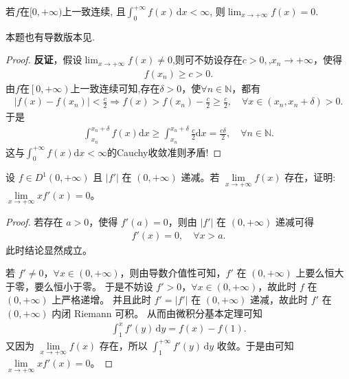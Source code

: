 \documentclass[../../main.tex]{subfiles}%
\begin{document}
\begin{proposition}\label{proposition:一致连续无穷积分收敛则极限为0}
若$f$在$[0, +\infty)$上一致连续, 且$\int_0^{+\infty} f(x) \, \mathrm{d}x < \infty$, 则$\lim_{x \to +\infty} f(x) = 0$.
\end{proposition}
\begin{note}
本题也有导数版本{见}.
\end{note}
\begin{proof}
\textbf{反证}，假设$\lim_{x\rightarrow +\infty} f\left( x \right) \ne 0$,则可不妨设存在$c>0,$,$x_n\rightarrow +\infty$，使得
\begin{align*}
f\left( x_n \right) \geqslant c>0.
\end{align*}
由$f$在$\left[ 0,+\infty \right)$上一致连续可知,存在$\delta >0$，使$\forall n\in \mathbb{N}$，都有
\begin{align*}
\left| f\left( x \right) -f\left( x_n \right) \right|<\frac{c}{2}\Longrightarrow f\left( x \right) >f\left( x_n \right) -\frac{c}{2}\geqslant \frac{c}{2},\quad \forall x\in \left( x_n,x_n+\delta \right) >0.
\end{align*}
于是
\begin{align*}
\int_{x_n}^{x_n+\delta}{f\left( x \right) \mathrm{d}x}\geqslant \int_{x_n}^{x_n+\delta}{\frac{c}{2}\mathrm{d}x}=\frac{c\delta}{2},\quad \forall n\in \mathbb{N} .
\end{align*}
这与$\int_0^{+\infty}{f\left( x \right) \mathrm{d}x}<\infty$的Cauchy收敛准则矛盾!
\end{proof}

\begin{example}
设 \(f\in D^{1}(0,+\infty)\) 且 \(|f'|\) 在 \((0,+\infty)\) 递减。若 \(\lim\limits_{x \to +\infty} f(x)\) 存在，证明: \(\lim\limits_{x \to +\infty} x f'(x)=0\)。 
\end{example}
\begin{proof}
若存在 \(a > 0\)，使得 \(f'(a) = 0\)，则由 \(|f'|\) 在 \((0, +\infty)\) 递减可得
\begin{align*}
f'(x) = 0, \quad \forall x > a.
\end{align*}
此时结论显然成立。

若 \(f' \neq 0\)，\(\forall x \in (0, +\infty)\)，则由导数介值性可知，\(f'\) 在 \((0, +\infty)\) 上要么恒大于零，要么恒小于零。
于是不妨设 \(f' > 0\)，\(\forall x \in (0, +\infty)\)，故此时 \(f\) 在 \((0, +\infty)\) 上严格递增。
并且此时 \(f' = |f'|\) 在 \((0, +\infty)\) 递减，故此时 \(f'\) 在 \((0, +\infty)\) 内闭 Riemann 可积。
从而由微积分基本定理可知
\begin{align*}
\int_1^x f'(y) \, \mathrm{d}y = f(x) - f(1).
\end{align*}
又因为 \(\lim\limits_{x \to +\infty} f(x)\) 存在，所以 \(\int_1^{+\infty} f'(y) \, \mathrm{d}y\) 收敛。于是由可知 \(\lim\limits_{x \to +\infty} x f'(x) = 0\)。
\end{proof}
\end{document}
